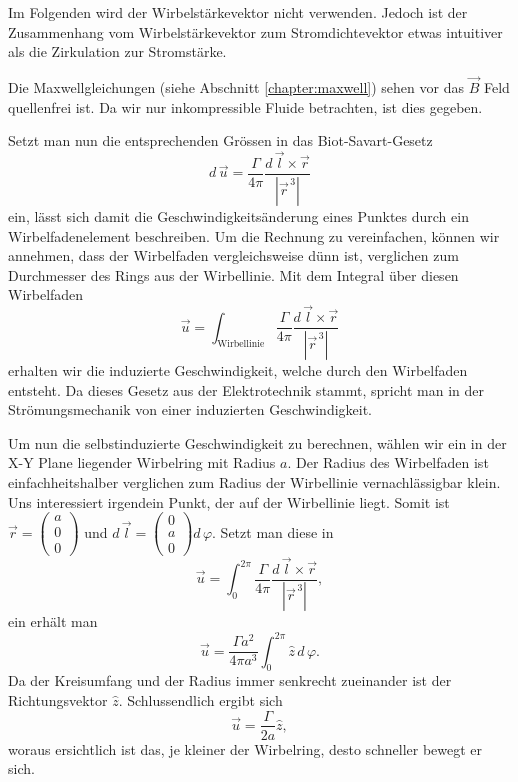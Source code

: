 Im Folgenden wird der Wirbelstärkevektor nicht verwenden.
Jedoch ist der Zusammenhang vom Wirbelstärkevektor zum Stromdichtevektor etwas intuitiver als die Zirkulation zur Stromstärke.

Die Maxwellgleichungen (siehe Abschnitt \ref{chapter:maxwell}) sehen vor das \(\vec{B}\) Feld quellenfrei ist. 
Da wir nur inkompressible Fluide betrachten, ist dies gegeben.

Setzt man nun die entsprechenden Grössen in das Biot-Savart-Gesetz
\[
d\, \vec{u}
=
\frac{\Gamma}{4\pi}\frac{d\, \vec{l} \times \vec{r}}{\left\lvert \vec{r}^{\,3}\right\rvert }
\]
ein, lässt sich damit die Geschwindigkeitsänderung eines Punktes durch ein Wirbelfadenelement beschreiben.
Um die Rechnung zu vereinfachen, können wir annehmen, dass der Wirbelfaden vergleichsweise dünn ist, verglichen zum Durchmesser des Rings aus der Wirbellinie.
Mit dem Integral über diesen Wirbelfaden
\[
\vec{u}
=
\int_{\text{Wirbellinie}} \frac{\Gamma}{4\pi}\frac{d\, \vec{l} \times \vec{r}}{\left\lvert \vec{r}^{\,3}\right\rvert}
\]
erhalten wir die induzierte Geschwindigkeit, welche durch den Wirbelfaden entsteht.
Da dieses Gesetz aus der Elektrotechnik stammt, spricht man in der Strömungsmechanik von einer induzierten Geschwindigkeit.

Um nun die selbstinduzierte Geschwindigkeit zu berechnen, wählen wir ein in der X-Y Plane liegender Wirbelring mit Radius \(a\).
Der Radius des Wirbelfaden ist einfachheitshalber verglichen zum Radius der Wirbellinie vernachlässigbar klein.
Uns interessiert irgendein Punkt, der auf der Wirbellinie liegt.
Somit ist
\(
\vec{r} = 
\begin{pmatrix}
    a\\
    0\\
    0    
\end{pmatrix}\)
und
\(
d\,\vec{l} = 
\begin{pmatrix}
    0\\
    a\\
    0    
\end{pmatrix}d\,\varphi \). 
Setzt man diese in
\[
\vec{u}
=
\int_{0}^{2\pi} \frac{\Gamma }{4\pi}\frac{d\, \vec{l} \times \vec{r}}{\left\lvert \vec{r}^{\,3}\right\rvert },
\]
ein erhält man 
\[
\vec{u}
=
\frac{\Gamma a^{2}}{4\pi a^{3}} \int_{0}^{2\pi} \hat{z}\, d\,\varphi.
\]
Da der Kreisumfang und der Radius immer senkrecht zueinander ist der Richtungsvektor \(\hat{z}\). 
Schlussendlich ergibt sich
\[
\vec{u}
=
\frac{\Gamma }{2 a}\hat{z},
\]
woraus ersichtlich ist das, je kleiner der Wirbelring, desto schneller bewegt er sich.

